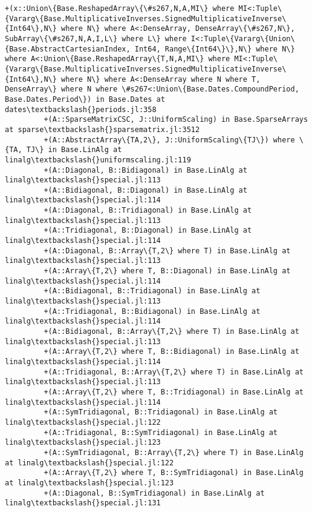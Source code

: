 \documentclass[11pt]{article}
\begin{document}
\begin{Verbatim}[commandchars=\\\{\}]
         +(x::Union\{Base.ReshapedArray\{\#s267,N,A,MI\} where MI<:Tuple\{Vararg\{Base.MultiplicativeInverses.SignedMultiplicativeInverse\{Int64\},N\} where N\} where A<:DenseArray, DenseArray\{\#s267,N\}, SubArray\{\#s267,N,A,I,L\} where L\} where I<:Tuple\{Vararg\{Union\{Base.AbstractCartesianIndex, Int64, Range\{Int64\}\},N\} where N\} where A<:Union\{Base.ReshapedArray\{T,N,A,MI\} where MI<:Tuple\{Vararg\{Base.MultiplicativeInverses.SignedMultiplicativeInverse\{Int64\},N\} where N\} where A<:DenseArray where N where T, DenseArray\} where N where \#s267<:Union\{Base.Dates.CompoundPeriod, Base.Dates.Period\}) in Base.Dates at dates\textbackslash{}periods.jl:358
         +(A::SparseMatrixCSC, J::UniformScaling) in Base.SparseArrays at sparse\textbackslash{}sparsematrix.jl:3512
         +(A::AbstractArray\{TA,2\}, J::UniformScaling\{TJ\}) where \{TA, TJ\} in Base.LinAlg at linalg\textbackslash{}uniformscaling.jl:119
         +(A::Diagonal, B::Bidiagonal) in Base.LinAlg at linalg\textbackslash{}special.jl:113
         +(A::Bidiagonal, B::Diagonal) in Base.LinAlg at linalg\textbackslash{}special.jl:114
         +(A::Diagonal, B::Tridiagonal) in Base.LinAlg at linalg\textbackslash{}special.jl:113
         +(A::Tridiagonal, B::Diagonal) in Base.LinAlg at linalg\textbackslash{}special.jl:114
         +(A::Diagonal, B::Array\{T,2\} where T) in Base.LinAlg at linalg\textbackslash{}special.jl:113
         +(A::Array\{T,2\} where T, B::Diagonal) in Base.LinAlg at linalg\textbackslash{}special.jl:114
         +(A::Bidiagonal, B::Tridiagonal) in Base.LinAlg at linalg\textbackslash{}special.jl:113
         +(A::Tridiagonal, B::Bidiagonal) in Base.LinAlg at linalg\textbackslash{}special.jl:114
         +(A::Bidiagonal, B::Array\{T,2\} where T) in Base.LinAlg at linalg\textbackslash{}special.jl:113
         +(A::Array\{T,2\} where T, B::Bidiagonal) in Base.LinAlg at linalg\textbackslash{}special.jl:114
         +(A::Tridiagonal, B::Array\{T,2\} where T) in Base.LinAlg at linalg\textbackslash{}special.jl:113
         +(A::Array\{T,2\} where T, B::Tridiagonal) in Base.LinAlg at linalg\textbackslash{}special.jl:114
         +(A::SymTridiagonal, B::Tridiagonal) in Base.LinAlg at linalg\textbackslash{}special.jl:122
         +(A::Tridiagonal, B::SymTridiagonal) in Base.LinAlg at linalg\textbackslash{}special.jl:123
         +(A::SymTridiagonal, B::Array\{T,2\} where T) in Base.LinAlg at linalg\textbackslash{}special.jl:122
         +(A::Array\{T,2\} where T, B::SymTridiagonal) in Base.LinAlg at linalg\textbackslash{}special.jl:123
         +(A::Diagonal, B::SymTridiagonal) in Base.LinAlg at linalg\textbackslash{}special.jl:131

\end{Verbatim}
\end{document}
